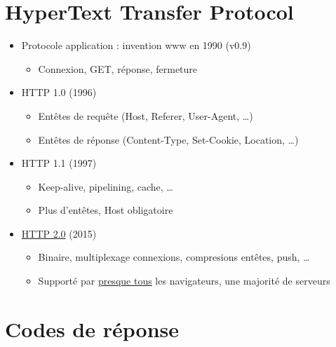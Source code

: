\hypertarget{hypertext-transfer-protocol}{%
\section{HyperText Transfer
Protocol}\label{hypertext-transfer-protocol}}

\begin{itemize}
\tightlist
\item
  Protocole application : invention www en 1990 (v0.9)

  \begin{itemize}
  \tightlist
  \item
    Connexion, GET, réponse, fermeture
  \end{itemize}
\item
  HTTP 1.0 (1996)

  \begin{itemize}
  \tightlist
  \item
    Entêtes de requête (Host, Referer, User-Agent, \ldots{})
  \item
    Entêtes de réponse (Content-Type, Set-Cookie, Location, \ldots{})
  \end{itemize}
\item
  HTTP 1.1 (1997)

  \begin{itemize}
  \tightlist
  \item
    Keep-alive, pipelining, cache, \ldots{}
  \item
    Plus d'entêtes, Host obligatoire
  \end{itemize}
\item
  \href{https://docs.google.com/presentation/d/1eqae3OBCxwWswOsaWMAWRpqnmrVVrAfPQclfSqPkXrA/present\#slide=id.p19}{HTTP
  2.0} (2015)

  \begin{itemize}
  \tightlist
  \item
    Binaire, multiplexage connexions, compresions entêtes, push,
    \ldots{}
  \item
    Supporté par \href{http://caniuse.com/\#feat=http2}{presque tous}
    les navigateurs, une majorité de serveurs
  \end{itemize}
\end{itemize}

\hypertarget{codes-de-ruxe9ponse}{%
\section{Codes de réponse}\label{codes-de-ruxe9ponse}}


